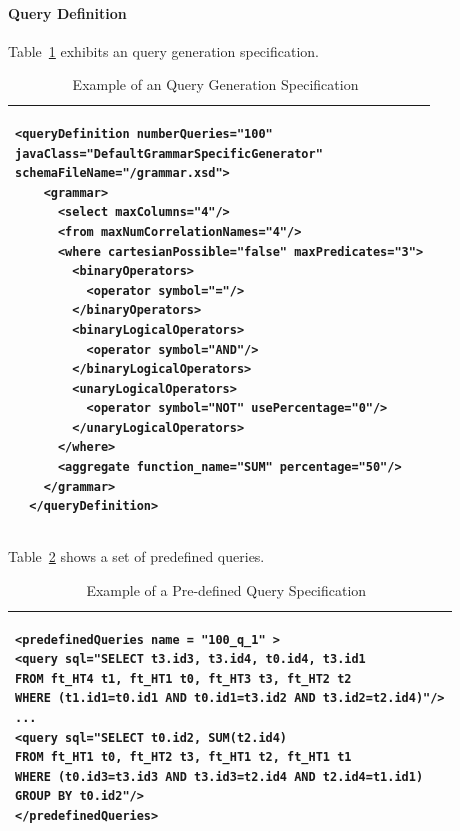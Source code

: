\documentclass[conference]{IEEEtran}
\begin{document}
\paragraph{Query Definition}
Table~\ref{tab:query_spec} exhibits an query generation specification. 

\begin{table}[htp!]
\begin{center}
{
\scriptsize
\begin{tabular}{|p{8.5cm}|} \hline
\begin{verbatim}
<queryDefinition numberQueries="100" 
javaClass="DefaultGrammarSpecificGenerator"
schemaFileName="/grammar.xsd">
    <grammar>
      <select maxColumns="4"/>
      <from maxNumCorrelationNames="4"/>
      <where cartesianPossible="false" maxPredicates="3">
        <binaryOperators>
          <operator symbol="="/>
        </binaryOperators>
        <binaryLogicalOperators>
          <operator symbol="AND"/>
        </binaryLogicalOperators>
        <unaryLogicalOperators>
          <operator symbol="NOT" usePercentage="0"/>
        </unaryLogicalOperators>
      </where>
      <aggregate function_name="SUM" percentage="50"/>
    </grammar>
  </queryDefinition>

\end{verbatim}
\\ \hline \end{tabular}
}
\caption{Example of an Query Generation Specification~\label{tab:query_spec}}
\end{center}
\end{table}

Table~\ref{tab:predefined_query_spec} shows a set of predefined queries. 

\begin{table}[htp!]
\begin{center}
{
\scriptsize
\begin{tabular}{|p{8.7cm}|} \hline
\begin{verbatim}
<predefinedQueries name = "100_q_1" >
<query sql="SELECT t3.id3, t3.id4, t0.id4, t3.id1 
FROM ft_HT4 t1, ft_HT1 t0, ft_HT3 t3, ft_HT2 t2  
WHERE (t1.id1=t0.id1 AND t0.id1=t3.id2 AND t3.id2=t2.id4)"/>
...
<query sql="SELECT t0.id2, SUM(t2.id4)  
FROM ft_HT1 t0, ft_HT2 t3, ft_HT1 t2, ft_HT1 t1  
WHERE (t0.id3=t3.id3 AND t3.id3=t2.id4 AND t2.id4=t1.id1) 
GROUP BY t0.id2"/>
</predefinedQueries>
\end{verbatim}
\\ \hline \end{tabular}
}
\caption{Example of a Pre-defined Query Specification~\label{tab:predefined_query_spec}}
\end{center}
\end{table}
  
\end{document}
